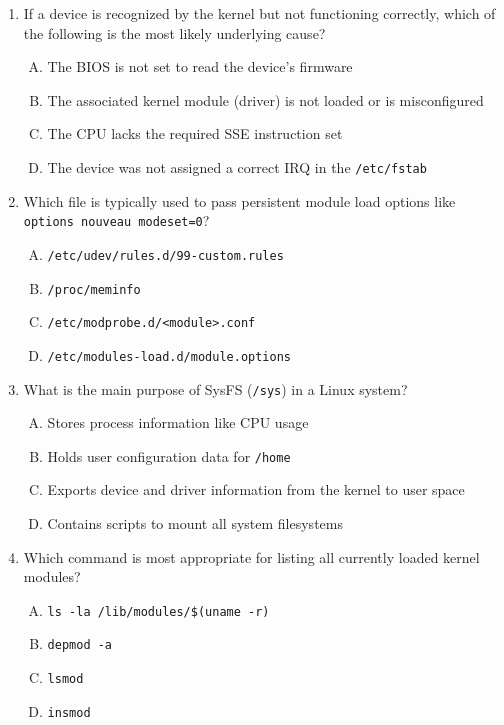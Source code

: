 \documentclass[12pt,a4paper]{report}
\begin{document}
\begin{enumerate}[1.]
\item If a device is recognized by the kernel but not functioning correctly, which of the following is the most likely underlying cause?
  \begin{enumerate}[A)]
    \item The BIOS is not set to read the device’s firmware
    \item The associated kernel module (driver) is not loaded or is misconfigured
    \item The CPU lacks the required SSE instruction set
    \item The device was not assigned a correct IRQ in the \texttt{/etc/fstab}
  \end{enumerate}

\item Which file is typically used to pass persistent module load options like \texttt{options nouveau modeset=0}?
  \begin{enumerate}[A)]
    \item \texttt{/etc/udev/rules.d/99-custom.rules}
    \item \texttt{/proc/meminfo}
    \item \texttt{/etc/modprobe.d/<module>.conf}
    \item \texttt{/etc/modules-load.d/module.options}
  \end{enumerate}

\item What is the main purpose of SysFS (\texttt{/sys}) in a Linux system?
  \begin{enumerate}[A)]
    \item Stores process information like CPU usage
    \item Holds user configuration data for \texttt{/home}
    \item Exports device and driver information from the kernel to user space
    \item Contains scripts to mount all system filesystems
  \end{enumerate}

\item Which command is most appropriate for listing all currently loaded kernel modules?
  \begin{enumerate}[A)]
    \item \texttt{ls -la /lib/modules/\$(uname -r)}
    \item \texttt{depmod -a}
    \item \texttt{lsmod}
    \item \texttt{insmod}
  \end{enumerate}


\end{enumerate}
\end{document}

